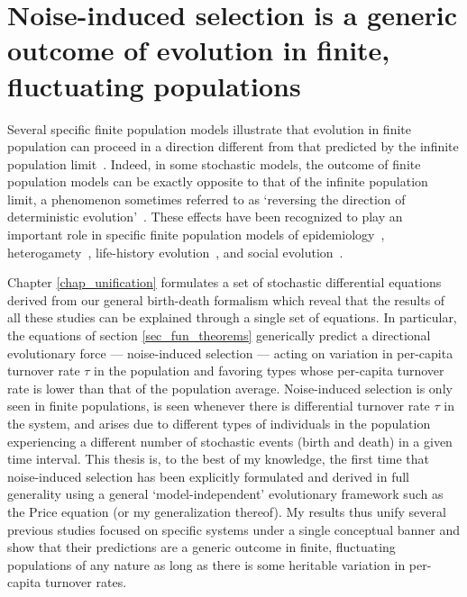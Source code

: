\section{Noise-induced selection is a generic outcome of evolution in finite, fluctuating populations}
 
Several specific finite population models illustrate that evolution in finite population can proceed in a direction different from that predicted by the infinite population limit~\citep{parsons_consequences_2010,melbinger_evolutionary_2010, houchmandzadeh_selection_2012, houchmandzadeh_fluctuation_2015,chotibut_evolutionary_2015,debarre_evolutionary_2016, behar_fluctuations-induced_2016, constable_demographic_2016,veller_drift-induced_2017,abu_awad_effects_2018,parsons_pathogen_2018,mcavoy_public_2018,mcleod_social_2019}. Indeed, in some stochastic models, the outcome of finite population models can be exactly opposite to that of the infinite population limit, a phenomenon sometimes referred to as `reversing the direction of deterministic evolution'~\citep{constable_demographic_2016,mcleod_social_2019, wang_reproductive_2023}. These effects have been recognized to play an important role in specific finite population models of epidemiology~\citep{kogan_two-strain_2014,humplik_evolutionary_2014,parsons_pathogen_2018,day_price_2020}, heterogamety~\citep{veller_drift-induced_2017,saunders_sex_2018}, life-history evolution~\citep{gillespie_natural_1974,kuosmanen_turnover_2022}, and social evolution~\citep{houchmandzadeh_selection_2012,houchmandzadeh_fluctuation_2015,chotibut_evolutionary_2015,constable_demographic_2016,mcleod_social_2019,wang_reproductive_2023}.

Chapter \ref{chap_unification} formulates a set of stochastic differential equations derived from our general birth-death formalism which reveal that the results of all these studies can be explained through a single set of equations. In particular, the equations of section \ref{sec_fun_theorems} generically predict a directional evolutionary force --- noise-induced selection --- acting on variation in per-capita turnover rate $\tau$ in the population and favoring types whose per-capita turnover rate is lower than that of the population average. Noise-induced selection is only seen in finite populations, is seen whenever there is differential turnover rate $\tau$ in the system, and arises due to different types of individuals in the population experiencing a different number of stochastic events (birth and death) in a given time interval. This thesis is, to the best of my knowledge, the first time that noise-induced selection has been explicitly formulated and derived in full generality using a general `model-independent' evolutionary framework such as the Price equation (or my generalization thereof). My results thus unify several previous studies focused on specific systems under a single conceptual banner and show that their predictions are a generic outcome in finite, fluctuating populations of any nature as long as there is some heritable variation in per-capita turnover rates.

